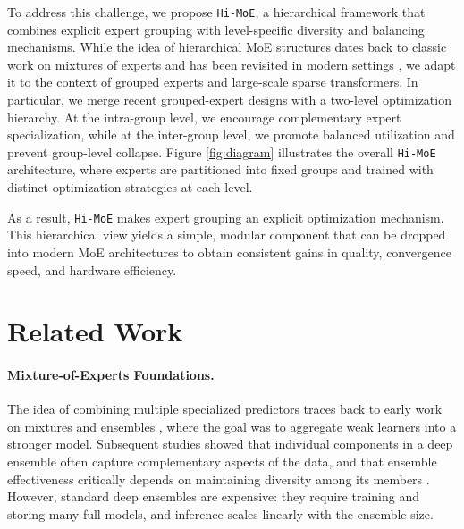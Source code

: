 \documentclass[sigconf,nonacm]{acmart}
\begin{document}
To address this challenge, we propose \texttt{Hi-MoE}, a hierarchical framework that combines explicit expert grouping with level-specific diversity and balancing mechanisms. While the idea of hierarchical MoE structures dates back to classic work on mixtures of experts \citep{jordan1994hierarchical} and has been revisited in modern settings \citep{hierarchical2, nguyen2024expert}, we adapt it to the context of grouped experts and large-scale sparse transformers. 
In particular, we merge recent grouped-expert designs with a two-level optimization hierarchy. At the intra-group level, we encourage complementary expert specialization, while at the inter-group level, we promote balanced utilization and prevent group-level collapse. Figure \ref{fig:diagram} illustrates the overall \texttt{Hi-MoE} architecture, where experts are partitioned into fixed groups and trained with distinct optimization strategies at each level.

As a result, \texttt{Hi-MoE} makes expert grouping an explicit optimization mechanism. This hierarchical view yields a simple, modular component that can be dropped into modern MoE architectures to obtain consistent gains in quality, convergence speed, and hardware efficiency.

\section{Related Work}
\paragraph{Mixture-of-Experts Foundations.} The idea of combining multiple specialized predictors traces back to early work on mixtures and ensembles \citep{de1989mixtures, jordan1991, jordan1994}, where the goal was to aggregate weak learners into a stronger model. Subsequent studies showed that individual components in a deep ensemble often capture complementary aspects of the data, and that ensemble effectiveness critically depends on maintaining diversity among its members \citep{allen2020towards}.
However, standard deep ensembles are expensive: they require training and storing many full models, and inference scales linearly with the ensemble size.
\end{document}
